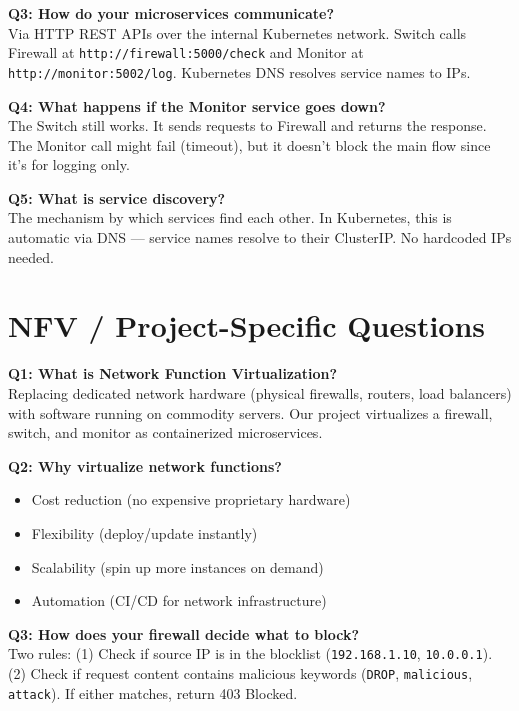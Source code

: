 \documentclass[12pt,a4paper]{article}
\begin{document}
\textbf{Q3: How do your microservices communicate?}\\
Via HTTP REST APIs over the internal Kubernetes network. Switch calls Firewall at \texttt{http://firewall:5000/check} and Monitor at \texttt{http://monitor:5002/log}. Kubernetes DNS resolves service names to IPs.

\textbf{Q4: What happens if the Monitor service goes down?}\\
The Switch still works. It sends requests to Firewall and returns the response. The Monitor call might fail (timeout), but it doesn't block the main flow since it's for logging only.

\textbf{Q5: What is service discovery?}\\
The mechanism by which services find each other. In Kubernetes, this is automatic via DNS --- service names resolve to their ClusterIP. No hardcoded IPs needed.

\section{NFV / Project-Specific Questions}

\textbf{Q1: What is Network Function Virtualization?}\\
Replacing dedicated network hardware (physical firewalls, routers, load balancers) with software running on commodity servers. Our project virtualizes a firewall, switch, and monitor as containerized microservices.

\textbf{Q2: Why virtualize network functions?}
\begin{itemize}[noitemsep]
    \item Cost reduction (no expensive proprietary hardware)
    \item Flexibility (deploy/update instantly)
    \item Scalability (spin up more instances on demand)
    \item Automation (CI/CD for network infrastructure)
\end{itemize}

\textbf{Q3: How does your firewall decide what to block?}\\
Two rules: (1) Check if source IP is in the blocklist (\texttt{192.168.1.10}, \texttt{10.0.0.1}). (2) Check if request content contains malicious keywords (\texttt{DROP}, \texttt{malicious}, \texttt{attack}). If either matches, return 403 Blocked.
\end{document}
